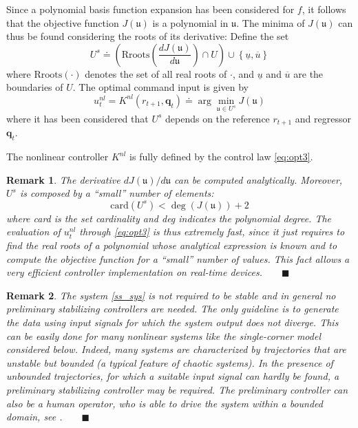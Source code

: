 \documentclass[twocolumn,english,journal]{IEEEtran}
\newtheorem{remark}{Remark}
\begin{document}
Since a polynomial basis function expansion has been considered for
$f$, it follows that the objective function $J\left(\mathfrak{u}\right)$
is a polynomial in $\mathfrak{u}$. The minima of $J\left(\mathfrak{u}\right)$
can thus be found considering the roots of its derivative: Define
the set
\[
U^{s}\doteq\left(\textrm{Rroots}\left(\frac{dJ\left(\mathfrak{u}\right)}{d\mathfrak{u}}\right)\cap U\right)\cup\left\{ \underline{u},\overline{u}\right\} 
\]
where $\textrm{Rroots}\left(\cdot\right)$ denotes the set of all
real roots of $\cdot$, and $\underline{u}$ and $\overline{u}$ are
the boundaries of $U$. The optimal command input is given by
\begin{equation}
u_{t}^{nl}=K^{nl}\left(r_{t+1},\boldsymbol{q}_{t}\right)\doteq\arg\min_{\mathfrak{u}\in U^{s}}J\left(\mathfrak{u}\right)\label{eq:opt3}
\end{equation}
where it has been considered that $U^{s}$ depends on the reference
$r_{t+1}$ and regressor $\boldsymbol{q}_{t}$. 

The nonlinear controller $K^{nl}$ is fully defined by the control
law \eqref{eq:opt3}. \medskip{}


\begin{remark}\label{rem:comp}The derivative $dJ\left(\mathfrak{u}\right)/d\mathfrak{u}$
can be computed analytically. Moreover, $U^{s}$ is composed by a
``small'' number of elements: 
\[
\textrm{card}\left(U^{s}\right)<\deg\left(J\left(\mathfrak{u}\right)\right)+2
\]
where card is the set cardinality and deg indicates the polynomial
degree. The evaluation of $u_{t}^{nl}$ through \eqref{eq:opt3} is
thus extremely fast, since it just requires to find the real roots
of a polynomial whose analytical expression is known and to compute
the objective function for a ``small'' number of values. This fact
allows a very efficient controller implementation on real-time devices.$\qquad\blacksquare$\end{remark}\medskip{}


\begin{remark}The system \eqref{ss_sys} is not required to be stable
and in general no preliminary stabilizing controllers are needed.
The only guideline is to generate the data using input signals for
which the system output does not diverge. This can be easily done
for many nonlinear systems like the single-corner model considered
below. Indeed, many systems are characterized by trajectories that
are unstable but bounded (a typical feature of chaotic systems). In
the presence of unbounded trajectories, for which a suitable input
signal can hardly be found, a preliminary stabilizing controller may
be required. The preliminary controller can also be a human operator,
who is able to drive the system within a bounded domain, see \cite{NoFaMiAUT13,movie_dfk}.$\qquad\blacksquare$\end{remark}
\end{document}
